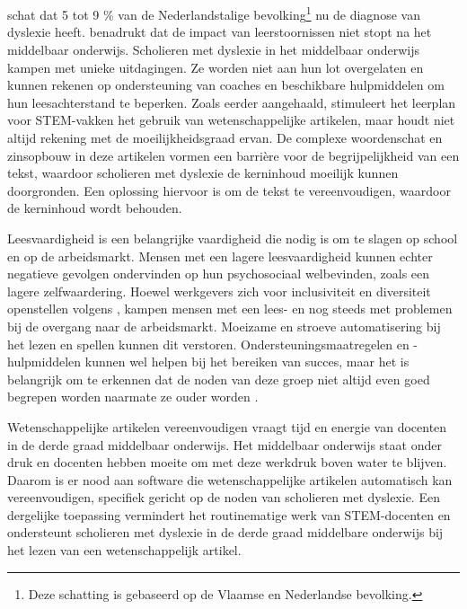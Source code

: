\section{}%
\label{sec:probleemstelling}

\textcite{Ghesquiere2018} schat dat 5 tot 9 \% van de Nederlandstalige bevolking\footnote{Deze schatting is gebaseerd op de Vlaamse en Nederlandse bevolking.} nu de diagnose van dyslexie heeft. \textcite{Lissens2020} benadrukt dat de impact van leerstoornissen niet stopt na het middelbaar onderwijs. Scholieren met dyslexie in het middelbaar onderwijs kampen met unieke uitdagingen. Ze worden niet aan hun lot overgelaten en kunnen rekenen op ondersteuning van coaches en beschikbare hulpmiddelen om hun leesachterstand te beperken. Zoals eerder aangehaald, stimuleert het leerplan voor STEM-vakken het gebruik van wetenschappelijke artikelen, maar houdt niet altijd rekening met de moeilijkheidsgraad ervan. De complexe woordenschat en zinsopbouw in deze artikelen vormen een barrière voor de begrijpelijkheid van een tekst, waardoor scholieren met dyslexie de kerninhoud moeilijk kunnen doorgronden. Een oplossing hiervoor is om de tekst te vereenvoudigen, waardoor de kerninhoud wordt behouden.

Leesvaardigheid is een belangrijke vaardigheid die nodig is om te slagen op school en op de arbeidsmarkt. Mensen met een lagere leesvaardigheid kunnen echter negatieve gevolgen ondervinden op hun psychosociaal welbevinden, zoals een lagere zelfwaardering. Hoewel werkgevers zich voor inclusiviteit en diversiteit openstellen volgens \textcite{Lissens2020}, kampen mensen met een lees- en  nog steeds met problemen bij de overgang naar de arbeidsmarkt. Moeizame en stroeve automatisering bij het lezen en spellen kunnen dit verstoren. Ondersteuningsmaatregelen en -hulpmiddelen kunnen wel helpen bij het bereiken van succes, maar het is belangrijk om te erkennen dat de noden van deze groep niet altijd even goed begrepen worden naarmate ze ouder worden \autocite{Lissens2020}. %

Wetenschappelijke artikelen vereenvoudigen vraagt tijd en energie van docenten in de derde graad middelbaar onderwijs. Het middelbaar onderwijs staat onder druk en docenten hebben moeite om met deze werkdruk boven water te blijven. Daarom is er nood aan software die wetenschappelijke artikelen automatisch kan vereenvoudigen, specifiek gericht op de noden van scholieren met dyslexie. Een dergelijke toepassing vermindert het routinematige werk van STEM-docenten en ondersteunt scholieren met dyslexie in de derde graad middelbare onderwijs bij het lezen van een wetenschappelijk artikel.


